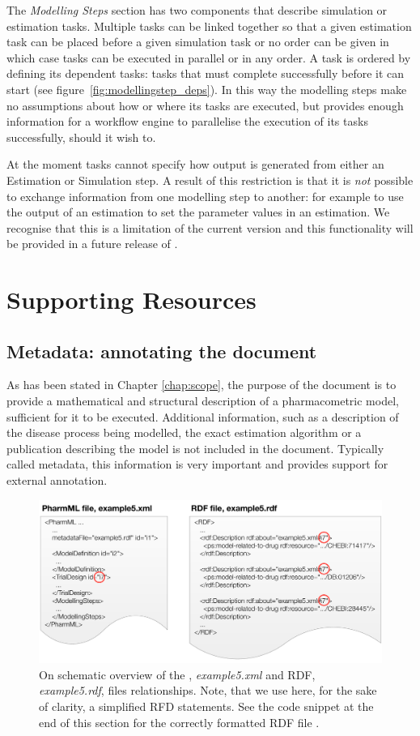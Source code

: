 The \emph{Modelling Steps} section has two components that describe
simulation or estimation tasks. Multiple tasks can be linked together so
that a given estimation task can be placed before a given simulation
task or no order can be given in which case tasks can be executed in
parallel or in any order. A task is ordered by defining its dependent
tasks: tasks that must complete successfully before it can start (see
figure~\ref{fig:modellingstep_deps}). In this way the modelling steps
make no assumptions about how or where its tasks are executed, but
provides enough information for a workflow engine to parallelise the
execution of its tasks successfully, should it wish to.

At the moment tasks cannot specify how output is generated from either
an Estimation or Simulation step. A result of this restriction is that
it is \emph{not} possible to exchange information from one modelling
step to another: for example to use the output of an estimation to set
the parameter values in an estimation. We recognise that this is a
limitation of the current version and this functionality will be
provided in a future release of \pharmml.


\section{Supporting Resources}
\label{sec:supporting-res}

\subsection{Metadata: annotating the \pharmml document}
\label{sec:annotation}

As has been stated in Chapter \ref{chap:scope}, the purpose of
the \pharmml document is to provide a mathematical and structural
description of a pharmacometric model, sufficient for it to be
executed. Additional information, such as a description of the disease
process being modelled, the exact estimation algorithm or a
publication describing the model is not included in the \pharmml
document. Typically called metadata, this information is very 
important and \pharmml provides support for external annotation.

\begin{figure}[htbp]
\centering
\includegraphics[width=0.8\linewidth]{pics/PharmML_RDF.pdf}
\caption{On schematic overview of the \pml, \emph{example5.xml} and RDF, 
\emph{example5.rdf}, files relationships. Note, that we use here, for the sake of clarity, 
a simplified RFD statements. See the code snippet at the end of this section 
for the correctly formatted RDF file \cite{RDF_2014}.}
\label{fig:pharmmlRdf}
\end{figure}

